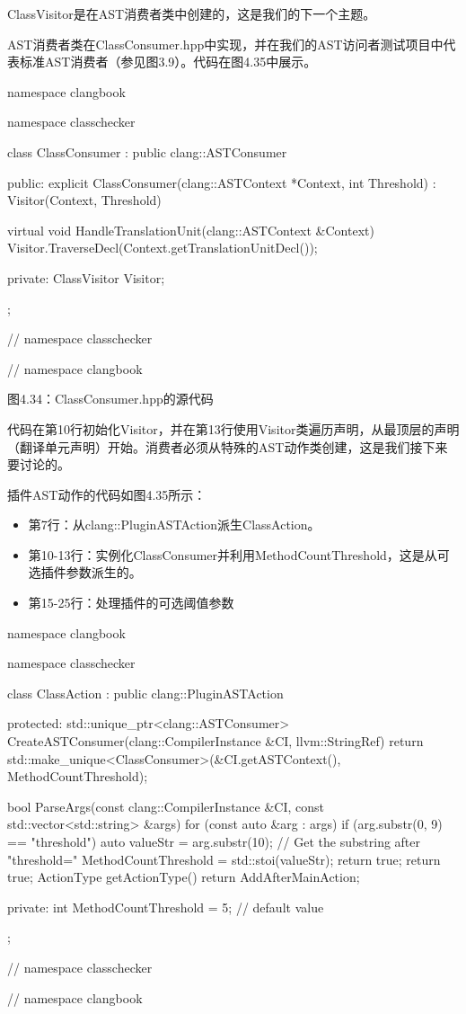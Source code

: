 ClassVisitor是在AST消费者类中创建的，这是我们的下一个主题。


AST消费者类在ClassConsumer.hpp中实现，并在我们的AST访问者测试项目中代表标准AST消费者（参见图3.9）。代码在图4.35中展示。

\begin{cpp}
namespace clangbook {
namespace classchecker {
class ClassConsumer : public clang::ASTConsumer {
public:
  explicit ClassConsumer(clang::ASTContext *Context, int Threshold)
    : Visitor(Context, Threshold) {}

  virtual void HandleTranslationUnit(clang::ASTContext &Context) {
    Visitor.TraverseDecl(Context.getTranslationUnitDecl());
  }

private:
  ClassVisitor Visitor;
};
} // namespace classchecker
} // namespace clangbook
\end{cpp}

\begin{center}
图4.34：ClassConsumer.hpp的源代码
\end{center}

代码在第10行初始化Visitor，并在第13行使用Visitor类遍历声明，从最顶层的声明（翻译单元声明）开始。消费者必须从特殊的AST动作类创建，这是我们接下来要讨论的。


插件AST动作的代码如图4.35所示：

\begin{itemize}
\item
第7行：从clang::PluginASTAction派生ClassAction。

\item
第10-13行：实例化ClassConsumer并利用MethodCountThreshold，这是从可选插件参数派生的。

\item
第15-25行：处理插件的可选阈值参数
\end{itemize}

\begin{cpp}
namespace clangbook {
namespace classchecker {
class ClassAction : public clang::PluginASTAction {
protected:
  std::unique_ptr<clang::ASTConsumer>
  CreateASTConsumer(clang::CompilerInstance &CI, llvm::StringRef) {
    return std::make_unique<ClassConsumer>(&CI.getASTContext(),
                                           MethodCountThreshold);
  }

  bool ParseArgs(const clang::CompilerInstance &CI,
    const std::vector<std::string> &args) {
      for (const auto &arg : args) {
        if (arg.substr(0, 9) == "threshold") {
          auto valueStr = arg.substr(10); // Get the substring after "threshold="
          MethodCountThreshold = std::stoi(valueStr);
          return true;
        }
      }
    return true;
  }
  ActionType getActionType() { return AddAfterMainAction; }

private:
  int MethodCountThreshold = 5; // default value
};
} // namespace classchecker
} // namespace clangbook
\end{cpp}

